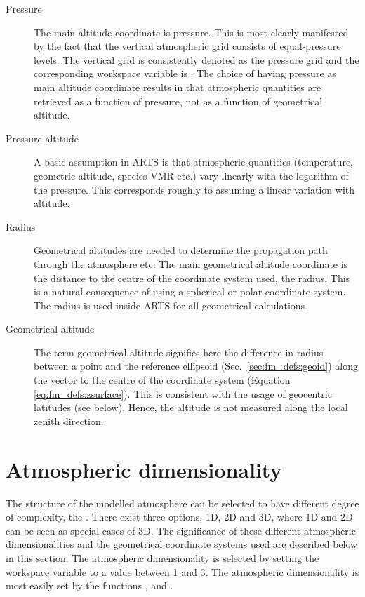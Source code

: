 \begin{description}
  
\item[Pressure] The main altitude coordinate is
  pressure. This is most clearly manifested by the fact that the
  vertical atmospheric grid consists of equal-pressure levels.
  The vertical grid is consistently denoted as the pressure grid and
  the corresponding workspace variable is . The
  choice of having pressure as main altitude coordinate results in
  that atmospheric quantities are retrieved as a function of pressure,
  not as a function of geometrical altitude.
  
\item[Pressure altitude] A basic assumption
  in ARTS is that atmospheric quantities (temperature, geometric
  altitude, species VMR etc.) vary linearly with the logarithm of the
  pressure. This corresponds roughly to assuming a linear variation
  with altitude. 

\item[Radius] Geometrical altitudes are
  needed to determine the propagation path through the atmosphere etc.
  The main geometrical altitude coordinate is the distance to the
  centre of the coordinate system used, the radius. This is a natural
  consequence of using a spherical or polar coordinate system. The
  radius is used inside ARTS for all geometrical calculations.
  
\item[Geometrical altitude] The term geometrical
  altitude signifies here the difference in radius between a point and the
  reference ellipsoid (Sec.~\ref{sec:fm_defs:geoid}) along the vector to the
  centre of the coordinate system (Equation \ref{eq:fm_defs:zsurface}). This is
  consistent with the usage of geocentric latitudes (see below). Hence, the
  altitude is not measured along the local zenith direction.
\end{description}



\section{Atmospheric dimensionality}
\label{sec:fm_defs:atmdim}

The structure of the modelled atmosphere can be selected to have different
degree of complexity, the . There exist
three options, 1D, 2D and 3D, where 1D and 2D can be seen as special cases of
3D. The significance of these different atmospheric dimensionalities and the
geometrical coordinate systems used are described below in this section. The
atmospheric dimensionality is selected by setting the workspace variable
 to a value between 1 and 3. The atmospheric
dimensionality is most easily set by the functions ,
 and .

